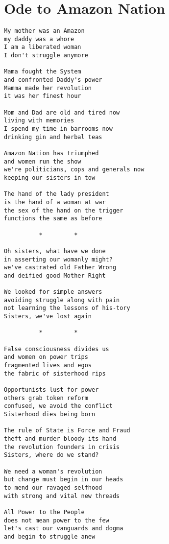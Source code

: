 \chapter{Ode to Amazon Nation}

\begin{verbatim}
My mother was an Amazon
my daddy was a whore
I am a liberated woman
I don't struggle anymore

Mama fought the System
and confronted Daddy's power
Mamma made her revolution
it was her finest hour

Mom and Dad are old and tired now
living with memories
I spend my time in barrooms now
drinking gin and herbal teas

Amazon Nation has triumphed
and women run the show
we're politicians, cops and generals now
keeping our sisters in tow

The hand of the lady president
is the hand of a woman at war
the sex of the hand on the trigger
functions the same as before

          *         *
          
Oh sisters, what have we done
in asserting our womanly might?
we've castrated old Father Wrong
and deified good Mother Right

We looked for simple answers
avoiding struggle along with pain
not learning the lessons of his-tory
Sisters, we've lost again

          *         *

False consciousness divides us
and women on power trips
fragmented lives and egos
the fabric of sisterhood rips

Opportunists lust for power
others grab token reform
confused, we avoid the conflict
Sisterhood dies being born

The rule of State is Force and Fraud
theft and murder bloody its hand
the revolution founders in crisis
Sisters, where do we stand?

We need a woman's revolution
but change must begin in our heads
to mend our ravaged selfhood
with strong and vital new threads

All Power to the People
does not mean power to the few
let's cast our vanguards and dogma
and begin to struggle anew
\end{verbatim}